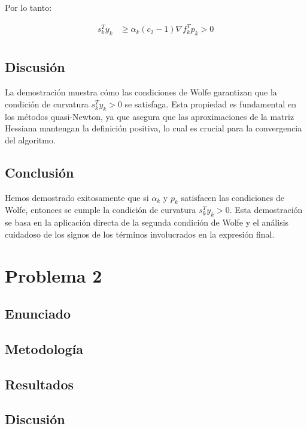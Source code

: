 \documentclass{article}
\begin{document}
Por lo tanto:

\begin{align}
    s_k^Ty_k &\geq \alpha_k(c_2 - 1) \nabla f_k^T p_k > 0 \\
\end{align}

\subsection{Discusión}

La demostración muestra cómo las condiciones de Wolfe garantizan que la condición de curvatura $s_k^T y_k > 0$ se satisfaga. Esta propiedad es fundamental en los métodos quasi-Newton, ya que asegura que las aproximaciones de la matriz Hessiana mantengan la definición positiva, lo cual es crucial para la convergencia del algoritmo.

\subsection{Conclusión}

Hemos demostrado exitosamente que si $\alpha_k$ y $p_k$ satisfacen las condiciones de Wolfe, entonces se cumple la condición de curvatura $s_k^T y_k > 0$. Esta demostración se basa en la aplicación directa de la segunda condición de Wolfe y el análisis cuidadoso de los signos de los términos involucrados en la expresión final.

\section{Problema 2}

\subsection{Enunciado}

\subsection{Metodología}

\subsection{Resultados}
\setcounter{equation}{0}

\subsection{Discusión}
\end{document}
